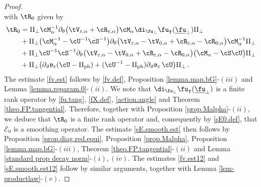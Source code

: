 \documentclass[a4paper,reqno,10pt]{article}
\newcommand{\pa}{\partial}
\newcommand{\sE}{\mathscr{E}}
\newcommand{\fv}{\mathfrak{v}}
\begin{document}
\begin{proof}
\begin{equation}
	\end{equation}
	with $\tR_{0}$ given by
	\begin{align}
		\tR_{0} & = \Pi_{\perp}  \cM_{\alpha}^{-1} \pa_{\theta} \big( \tV_{\varepsilon,\alpha}  + \cR_{\varepsilon,\alpha} \big) \cM_{\alpha} \di_{\fu_{\perp}} \fu_{\intercal}(\underline{\fu}_{\perp}) \Pi_{\perp} \\
		& + \Pi_{\perp}   \big( \cM_{\alpha}^{-1}  - \cU^{-1} \cS^{-1} \big)\pa_{\theta} \big( \tV_{\varepsilon,\alpha} - \tV_{0,\alpha}  + \cR_{\varepsilon,\alpha} -\cR_{0,\alpha}\big)\cM_{\alpha}^{-1}\Pi_{\perp} \\
		& + \Pi_{\perp} \cU^{-1} \cS^{-1} \pa_{\theta} \big( \tV_{\varepsilon,\alpha} - \tV_{0,\alpha}  + \cR_{\varepsilon,\alpha} -\cR_{0,\alpha}\big) \big(\cM_{\alpha}- \cS \cU\big)\Pi_{\perp}  \\
        & + \Pi_{\perp} \big( \pa_{\vartheta} \fv_{\varepsilon} (\cU-\Pi_{\rm ph}) + (\cU^{-1}-\Pi_{\rm ph})\pa_{\vartheta} \fv_{\varepsilon} \,\cU  \big)\Pi_{\perp} \,.
	\end{align}
	The estimate \eqref{fv.est}  follows by \eqref{fv.def}, Proposition \eqref{lemma.map.bG}-$(iii)$ and Lemma \ref{lemma.reparam.0}-$(ii)$. We note that $ \di_{\fu_{\perp}} \fu_{\intercal}(\underline{\fu}_{\perp})$ is a finite rank operator by \eqref{fu.tang}, \eqref{fX.def}, \eqref{action.angle} and Theorem \ref{theo.FP.tangential}. Therefore, together with Proposition \ref{prop.Malpha}-$(ii)$, we deduce that $\tR_{0}$ is a finite rank operator and, consequently by \eqref{sE0.def}, that $\sE_{0}$ is a smoothing operator. The estimate  \eqref{sE.smooth.est} then follows by Proposition \ref{prop.diag.red.equi}, Proposition \ref{prop.Malpha}, Proposition \ref{lemma.map.bG}-$(iii)$, Theorem \ref{theo.FP.tangential}-$(ii)$ and Lemma \ref{standard prop decay norm}-$(i),(iv)$. The estimates \eqref{fv.est12} and \eqref{sE.smooth.est12} follow by similar arguments, together with Lemma \ref{lem-productlaw}-$(v)$.
\end{proof}
\end{document}
